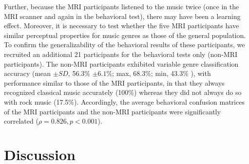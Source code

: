 \documentclass[journal]{IEEEtran}
\begin{document}
Further, because the MRI participants listened to the music twice (once in the MRI scanner and again in the behavioral test), there may have been a learning effect.
Moreover, it is necessary to test whether the five MRI participants have similar perceptual properties for music genres as those of the general population.
To confirm the generalizability of the behavioral results of these participants, we recruited an additional 21 participants for the behavioral tests only (non-MRI participants).
The non-MRI participants exhibited variable genre classification accuracy (mean $\pm SD $, 56.3\% $ \pm 6.1\% $; max, 68.3\%; min, 43.3\% ), with performance similar to those of the MRI participants, in that they always recognized classical music accurately (100\%) whereas they did not always do so with rock music (17.5\%). 
Accordingly, the average behavioral confusion matrices of the MRI participants and the non-MRI participants were significantly correlated ($ \rho = 0.826, p < 0.001 $).








\section{Discussion}
\label{sec:discussion}
\end{document}
